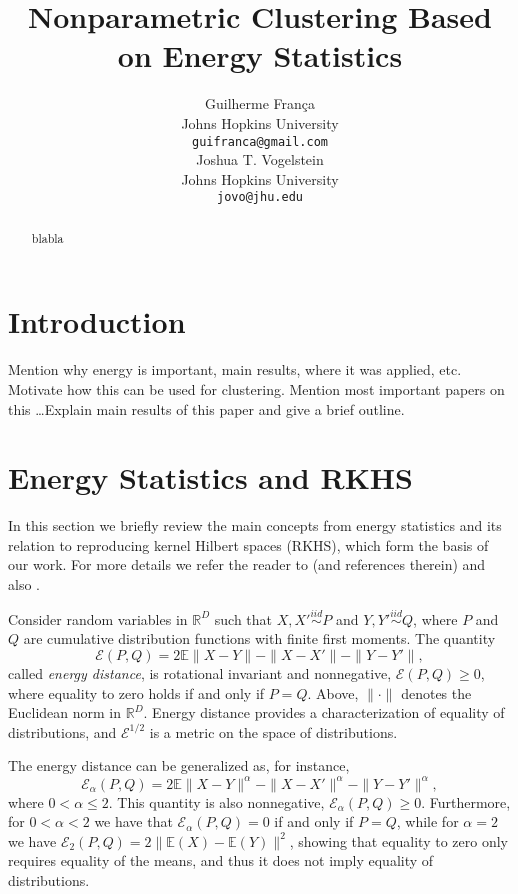 \documentclass{article}
\title{Nonparametric Clustering Based on Energy Statistics}
\author{
Guilherme Fran\c ca \\
Johns Hopkins University\\
\texttt{guifranca@gmail.com} \\
\And
Joshua T. Vogelstein \\
Johns Hopkins University\\
\texttt{jovo@jhu.edu}
}
\newcommand\Energy{\mathcal{E}}
\newcommand\E{\mathbb{E}}
\begin{document}
\maketitle

\begin{abstract}
blabla
\end{abstract}



\section{Introduction}

Mention why energy is important, main results, where it was applied, etc.
Motivate how this can be used for clustering. Mention most important
papers on this \ldots Explain main results of this paper and give a brief
outline.


\section{Energy Statistics and RKHS}
\label{sec:background}

In this section we briefly review the main concepts from energy
statistics and its relation to reproducing kernel Hilbert spaces 
(RKHS), which form the basis of our work.
For more details we refer the reader
to \cite{Szkely2013} (and references therein) and also \cite{Sejdinovic2013}.

Consider random variables in $\mathbb{R}^D$ 
such that $X,X' \stackrel{iid}{\sim} P$ and 
$Y,Y' \stackrel{iid}{\sim} Q$, where $P$ and $Q$ are cumulative
distribution functions with finite first moments. 
The quantity \cite{Szkely2013}
\begin{equation}\label{eq:energy}
\Energy(P, Q) = 2 \E \| X - Y\| - \| X - X' \| - \| Y - Y' \|,
\end{equation}
called \emph{energy distance}, 
is rotational invariant and nonnegative, $\Energy(P,Q) \ge 0$, where
equality
to zero holds if and only if $P = Q$.
Above, $\| \cdot \|$ denotes the
Euclidean norm in $\mathbb{R}^D$. 
Energy distance
provides a characterization of equality of distributions, and
$\Energy^{1/2}$ is
a metric on the space of distributions.

The energy distance can be generalized as, for instance,
\begin{equation}\label{eq:energy2}
\Energy_\alpha(P, Q) = 2 \E \| X - Y\|^{\alpha} - \| X - X' \|^{\alpha} - 
\| Y - Y' \|^{\alpha},
\end{equation}
where $0<\alpha\le 2$. This quantity is also nonnegative,
$\Energy_\alpha(P,Q) \ge 0$. Furthermore, for $0<\alpha<2$ we have that
$\Energy_\alpha(P,Q) = 0$ if and only if $P=Q$, while for $\alpha=2$ 
we have $\Energy_2(P,Q) = 2\| \E(X) - \E(Y) \|^2$, showing that
equality to zero only requires
equality of the means, and thus it does not imply equality of distributions.
\end{document}
